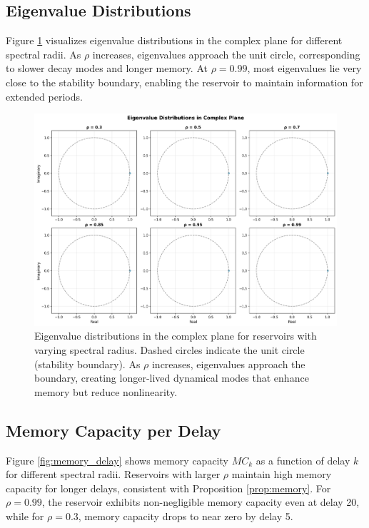 \documentclass{article}
\begin{document}
\subsection{Eigenvalue Distributions}

Figure \ref{fig:eigenvalues} visualizes eigenvalue distributions in the complex plane for different spectral radii. As $\rho$ increases, eigenvalues approach the unit circle, corresponding to slower decay modes and longer memory. At $\rho = 0.99$, most eigenvalues lie very close to the stability boundary, enabling the reservoir to maintain information for extended periods.

\begin{figure}[htbp]
\centering
\includegraphics[width=\textwidth]{fig3_eigenvalue_distributions.png}
\caption{Eigenvalue distributions in the complex plane for reservoirs with varying spectral radius. Dashed circles indicate the unit circle (stability boundary). As $\rho$ increases, eigenvalues approach the boundary, creating longer-lived dynamical modes that enhance memory but reduce nonlinearity.}
\label{fig:eigenvalues}
\end{figure}

\subsection{Memory Capacity per Delay}

Figure \ref{fig:memory_delay} shows memory capacity $MC_k$ as a function of delay $k$ for different spectral radii. Reservoirs with larger $\rho$ maintain high memory capacity for longer delays, consistent with Proposition \ref{prop:memory}. For $\rho = 0.99$, the reservoir exhibits non-negligible memory capacity even at delay 20, while for $\rho = 0.3$, memory capacity drops to near zero by delay 5.
\end{document}
